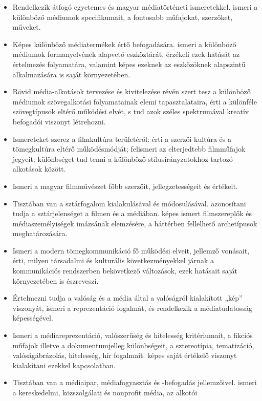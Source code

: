 \begin{itemize}
\item
  Rendelkezik átfogó egyetemes és magyar médiatörténeti ismeretekkel.
  ismeri a különböző médiumok specifikumait, a fontosabb műfajokat,
  szerzőket, műveket.
\item
  Képes különböző médiatermékek értő befogadására. ismeri a különböző
  médiumok formanyelvének alapvető eszköztárát, érzékeli ezek hatását az
  értelmezés folyamatára, valamint képes ezeknek az eszközöknek
  alapszintű alkalmazására is saját környezetében.
\item
  Rövid média-alkotások tervezése és kivitelezése révén szert tesz a
  különböző médiumok szövegalkotási folyamatainak elemi tapasztalataira,
  érti a különféle szövegtípusok eltérő működési elvét, s tud azok
  széles spektrumával kreatív befogadói viszonyt létrehozni.
\item
  Ismereteket szerez a filmkultúra területéről: érti a szerzői kultúra
  és a tömegkultúra eltérő működésmódját; felismeri az elterjedtebb
  filmműfajok jegyeit; különbséget tud tenni a különböző
  stílusirányzatokhoz tartozó alkotások között.
\item
  Ismeri a magyar filmművészet főbb szerzőit, jellegzetességeit és
  értékeit.
\item
  Tisztában van a sztárfogalom kialakulásával és módosulásával.
  azonosítani tudja a sztárjelenséget a filmen és a médiában. képes
  ismert filmszereplők és médiaszemélyiségek imázsának elemzésére, a
  háttérben fellelhető archetípusok meghatározására.
\item
  Ismeri a modern tömegkommunikáció fő működési elveit, jellemző
  vonásait, érti, milyen társadalmi és kulturális következményekkel
  járnak a kommunikációs rendszerben bekövetkező változások, ezek
  hatásait saját környezetében is észreveszi.
\item
  Értelmezni tudja a valóság és a média által a valóságról kialakított
  „kép'' viszonyát, ismeri a reprezentáció fogalmát, és rendelkezik a
  médiatudatosság képességével.
\item
  Ismeri a médiareprezentáció, valószerűség és hitelesség kritériumait,
  a fikciós műfajok illetve a dokumentumjelleg különbségeit, a
  sztereotípia, tematizáció, valóságábrázolás, hitelesség, hír
  fogalmait. képes saját értékelő viszonyt kialakítani ezekkel
  kapcsolatban.
\item
  Tisztában van a médiaipar, médiafogyasztás és -befogadás jellemzőivel.
  ismeri a kereskedelmi, közszolgálati és nonprofit média, az alkotói

\end{itemize}
